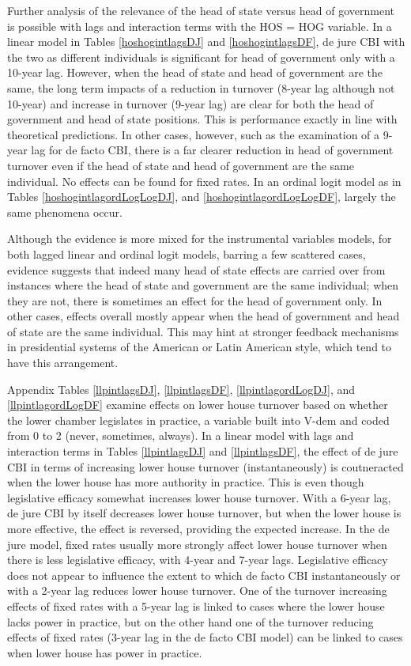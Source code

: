 \documentclass{article}
\begin{document}
    Further analysis of the relevance of the head of state versus head of government is possible with lags and interaction terms with the HOS = HOG variable. In a linear model in Tables \ref{hoshogintlagsDJ} and \ref{hoshogintlagsDF}, de jure CBI with the two as different individuals is significant for head of government only with a 10-year lag. However, when the head of state and head of government are the same, the long term impacts of a reduction in turnover (8-year lag although not 10-year) and increase in turnover (9-year lag) are clear for both the head of government and head of state positions. This is performance exactly in line with theoretical predictions. In other cases, however, such as the examination of a 9-year lag for de facto CBI, there is a far clearer reduction in head of government turnover even if the head of state and head of government are the same individual. No effects can be found for fixed rates. In an ordinal logit model as in Tables \ref{hoshogintlagordLogLogDJ}, and \ref{hoshogintlagordLogLogDF}, largely the same phenomena occur. 

    Although the evidence is more mixed for the instrumental variables models, for both lagged linear and ordinal logit models, barring a few scattered cases, evidence suggests that indeed many head of state effects are carried over from instances where the head of state and government are the same individual; when they are not, there is sometimes an effect for the head of government only. In other cases, effects overall mostly appear when the head of government and head of state are the same individual. This may hint at stronger feedback mechanisms in presidential systems of the American or Latin American style, which tend to have this arrangement.

    Appendix Tables \ref{llpintlagsDJ}, \ref{llpintlagsDF}, \ref{llpintlagordLogDJ}, and \ref{llpintlagordLogDF} examine effects on lower house turnover based on whether the lower chamber legislates in practice, a variable built into V-dem and coded from 0 to 2 (never, sometimes, always). In a linear model with lags and interaction terms in Tables \ref{llpintlagsDJ} and \ref{llpintlagsDF}, the effect of de jure CBI in terms of increasing lower house turnover (instantaneously) is coutneracted when the lower house has more authority in practice. This is even though legislative efficacy somewhat increases lower house turnover. With a 6-year lag, de jure CBI by itself decreases lower house turnover, but when the lower house is more effective, the effect is reversed, providing the expected increase. In the de jure model, fixed rates usually more strongly affect lower house turnover when there is less legislative efficacy, with 4-year and 7-year lags. Legislative efficacy does not appear to influence the extent to which de facto CBI instantaneously or with a 2-year lag reduces lower house turnover. One of the turnover increasing effects of fixed rates with a 5-year lag is linked to cases where the lower house lacks power in practice, but on the other hand one of the turnover reducing effects of fixed rates (3-year lag in the de facto CBI model) can be linked to cases when lower house has power in practice.
\end{document}

